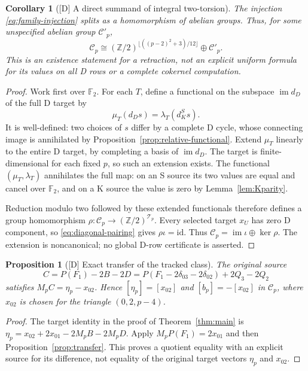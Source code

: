 \documentclass[11pt]{article}
\newtheorem{proposition}[theorem]{Proposition}
\newtheorem{corollary}[theorem]{Corollary}
\theoremstyle{definition}
\theoremstyle{remark}
\newcommand{\Z}{\mathbb Z}
\begin{document}
\begin{corollary}[{[D]} A direct summand of integral two-torsion]\label{cor:splitting}
The injection \eqref{eq:family-injection} splits as a homomorphism of
abelian groups. Thus, for some unspecified abelian group $\mathcal C'_p$,
\[
 \mathcal C_p\cong
 (\Z/2)^{\lfloor((p-2)^2+3)/12\rfloor}\oplus\mathcal C'_p.
\]
This is an existence statement for a retraction, not an explicit uniform
formula for its values on all D rows or a complete cokernel computation.
\end{corollary}
\begin{proof}
Work first over $\mathbb F_2$. For each $T$, define a functional on
the subspace $\operatorname{im}d_D$ of the full D target by
\[
 \mu_T(d_Ds)=\lambda_T(d_K^Ss).
\]
It is well-defined: two choices of $s$ differ by a complete D cycle,
whose connecting image is annihilated by
Proposition~\ref{prop:relative-functional}. Extend $\mu_T$ linearly
to the entire D target, by completing a basis of $\operatorname{im}d_D$.
The target is finite-dimensional for each fixed $p$, so such an extension
exists. The functional $(\mu_T,\lambda_T)$ annihilates the full map:
on an S source its two values are equal and cancel over $\mathbb F_2$,
and on a K source the value is zero by Lemma~\ref{lem:Kparity}.

Reduction modulo two followed by these extended functionals therefore
defines a group homomorphism
$\rho:\mathcal C_p\longrightarrow(\Z/2)^{\mathcal T_p}$.
Every selected target $x_U$ has zero D component, so
\eqref{eq:diagonal-pairing} gives $\rho\iota=\mathrm{id}$.
Thus $\mathcal C_p=\operatorname{im}\iota\oplus\ker\rho$.
The extension is noncanonical; no global D-row certificate is asserted.
\end{proof}

\begin{proposition}[{[D]} Exact transfer of the tracked class]\label{prop:eta-edge}
The original source
\begin{equation}\label{eq:eta-edge-source}
 C=P(F_1)-2B-2D
   =P(F_1-2\delta_{03}-2\delta_{02})+2Q_3-2Q_2
\end{equation}
satisfies $M_pC=\eta_p-x_{02}$. Hence
$[\eta_p]=[x_{02}]$ and $[b_p]=-[x_{02}]$ in $\mathcal C_p$,
where $x_{02}$ is chosen for the triangle $(0,2,p-4)$.
\end{proposition}
\begin{proof}
The target identity in the proof of Theorem~\ref{thm:main} is
$\eta_p=x_{02}+2x_{01}-2M_pB-2M_pD$. Apply
$M_pP(F_1)=2x_{01}$ and then Proposition~\ref{prop:transfer}.
This proves a quotient equality with an explicit source for its difference,
not equality of the original target vectors $\eta_p$ and $x_{02}$.
\end{proof}
\end{document}
